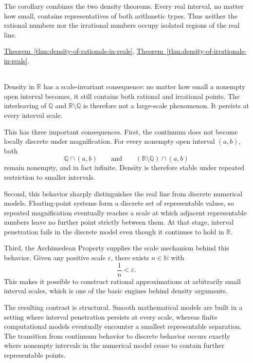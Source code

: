 \begin{remark*}[Interpretation]
The corollary combines the two density theorems. Every real interval, no matter how small, contains representatives of both arithmetic types. Thus neither the rational numbers nor the irrational numbers occupy isolated regions of the real line.
\end{remark*}

\begin{remark*}[Dependencies]
\hyperref[thm:density-of-rationals-in-reals]{Theorem~\ref*{thm:density-of-rationals-in-reals}},
\hyperref[thm:density-of-irrationals-in-reals]{Theorem~\ref*{thm:density-of-irrationals-in-reals}}.
\end{remark*}








\begin{remark*}~\\
Density in $\mathbb{R}$ has a scale-invariant consequence: no matter how small a nonempty
open interval becomes, it still contains both rational and irrational points. The interleaving
of $\mathbb{Q}$ and $\mathbb{R}\setminus\mathbb{Q}$ is therefore not a large-scale phenomenon.
It persists at every interval scale.

This has three important consequences. First, the continuum does not become locally discrete
under magnification. For every nonempty open interval $(a,b)$, both
\[
\mathbb{Q}\cap(a,b)
\qquad\text{and}\qquad
(\mathbb{R}\setminus\mathbb{Q})\cap(a,b)
\]
remain nonempty, and in fact infinite. Density is therefore stable under repeated restriction
to smaller intervals.

Second, this behavior sharply distinguishes the real line from discrete numerical models.
Floating-point systems form a discrete set of representable values, so repeated magnification
eventually reaches a scale at which adjacent representable numbers leave no further point
strictly between them. At that stage, interval penetration fails in the discrete model even
though it continues to hold in $\mathbb{R}$.

Third, the Archimedean Property supplies the scale mechanism behind this behavior. Given any
positive scale $\varepsilon$, there exists $n\in\mathbb{N}$ with
\[
\frac{1}{n}<\varepsilon.
\]
This makes it possible to construct rational approximations at arbitrarily small interval
scales, which is one of the basic engines behind density arguments.

The resulting contrast is structural. Smooth mathematical models are built in a setting where
interval penetration persists at every scale, whereas finite computational models eventually
encounter a smallest representable separation. The transition from continuum behavior to
discrete behavior occurs exactly where nonempty intervals in the numerical model cease to
contain further \\representable points.
\end{remark*}


